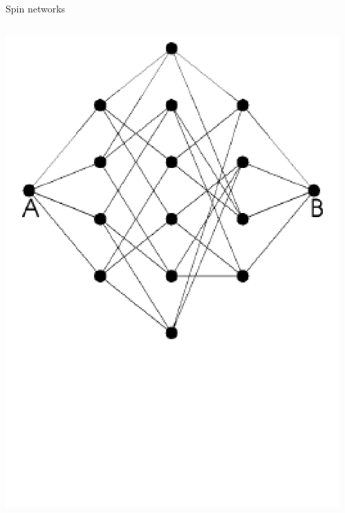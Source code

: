 {\begin{frame}[t]{Spin networks}
\begin{columns}[T]
\begin{column}{0.33\textwidth}
    		\includegraphics[trim=0 0 0 70mm, width=\textwidth]{Images/chain3_cubic_flattened}
		\end{column}
     	\begin{column}{0.33\textwidth}
     		\centering

\end{column}
\end{columns}
\end{frame}}

